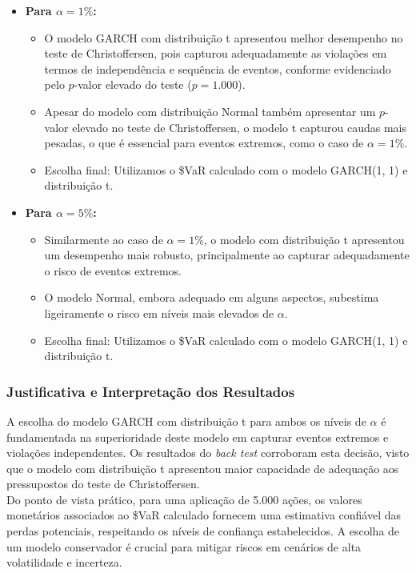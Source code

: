 \documentclass[a4paper, 12pt]{article}
\begin{document}
\begin{itemize}
    \item \textbf{Para \(\alpha = 1\%\):}
    \begin{itemize}
        \item O modelo GARCH com distribuição t apresentou melhor desempenho no teste de Christoffersen, pois capturou adequadamente as violações em termos de independência e sequência de eventos, conforme evidenciado pelo \(p\)-valor elevado do teste (\(p = 1.000\)).
        \item Apesar do modelo com distribuição Normal também apresentar um \(p\)-valor elevado no teste de Christoffersen, o modelo t capturou caudas mais pesadas, o que é essencial para eventos extremos, como o caso de \(\alpha = 1\%\).
        \item Escolha final: Utilizamos o \$VaR calculado com o modelo GARCH(1, 1) e distribuição t.
    \end{itemize}

    \item \textbf{Para \(\alpha = 5\%\):}
    \begin{itemize}
        \item Similarmente ao caso de \(\alpha = 1\%\), o modelo com distribuição t apresentou um desempenho mais robusto, principalmente ao capturar adequadamente o risco de eventos extremos. 
        \item O modelo Normal, embora adequado em alguns aspectos, subestima ligeiramente o risco em níveis mais elevados de \(\alpha\).
        \item Escolha final: Utilizamos o \$VaR calculado com o modelo GARCH(1, 1) e distribuição t.
    \end{itemize}
\end{itemize}

\subsubsection{Justificativa e Interpretação dos Resultados}

A escolha do modelo GARCH com distribuição t para ambos os níveis de \(\alpha\) é fundamentada na superioridade deste modelo em capturar eventos extremos e violações independentes. Os resultados do \emph{back test} corroboram esta decisão, visto que o modelo com distribuição t apresentou maior capacidade de adequação aos pressupostos do teste de Christoffersen.\\

Do ponto de vista prático, para uma aplicação de 5.000 ações, os valores monetários associados ao \$VaR calculado fornecem uma estimativa confiável das perdas potenciais, respeitando os níveis de confiança estabelecidos. A escolha de um modelo conservador é crucial para mitigar riscos em cenários de alta volatilidade e incerteza.
\end{document}
